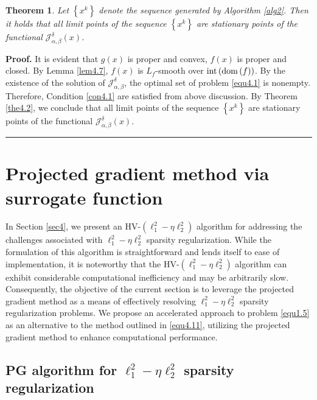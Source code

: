\documentclass[a4paper,12pt]{article}
\newtheorem{theorem}{Theorem}[section]
\numberwithin{equation}{section}
\newenvironment{proof}[1][Proof]{\textbf{#1.} }
{\ \rule{0.75em}{0.75em}\smallskip}
\begin{document}
\begin{theorem}\label{the4.9}
    Let $\left\{x^{k}\right\}$ denote the sequence generated by Algorithm \ref{alg2}. Then it holds that all limit points of the sequence $\left\{x^{k}\right\}$ are stationary points of the functional $\mathcal{J}_{\alpha,\beta}^{\delta}\left(x\right)$.
\end{theorem}

\begin{proof}
    It is evident that $g\left(x\right)$ is proper and convex, $f\left(x\right)$ is proper and closed. By Lemma \ref{lem4.7}, $f\left(x\right)$ is $L_{f}$-smooth over ${\rm int}\left({\rm dom}\left(f\right)\right)$. By the existence of the solution of $\mathcal{J}_{\alpha,\beta}^{\delta}$, the optimal set of problem \eqref{equ4.1} is nonempty. Therefore, Condition \ref{con4.1} are satisfied from above discussion. By Theorem \ref{the4.2}, we conclude that all limit points of the sequence $\left\{x^{k}\right\}$ are stationary points of the functional $\mathcal{J}_{\alpha,\beta}^{\delta}\left(x\right)$.
\end{proof}

\section{Projected gradient method via surrogate function}\label{sec5}

\par In Section \ref{sec4}, we present an HV-$\left(\ell_{1}^{2}-\eta\ell_{2}^{2}\right)$ algorithm for addressing the challenges associated with $\ell_{1}^{2}-\eta\ell_{2}^{2}$ sparsity regularization. While the formulation of this algorithm is straightforward and lends itself to ease of implementation, it is noteworthy that the  HV-$\left(\ell_{1}^{2}-\eta\ell_{2}^{2}\right)$ algorithm can exhibit considerable computational inefficiency and may be arbitrarily slow. Consequently, the objective of the current section is to leverage the projected gradient method as a means of effectively resolving $\ell_{1}^{2}-\eta\ell_{2}^{2}$ sparsity regularization problems. We propose an accelerated approach to problem \eqref{equ1.5} as an alternative to the method outlined in \eqref{equ4.11}, utilizing the projected gradient method to enhance computational performance.

\subsection{PG algorithm for $\ell_{1}^{2}-\eta\ell_{2}^{2}$ sparsity regularization}\label{sec5.1}
\end{document}
